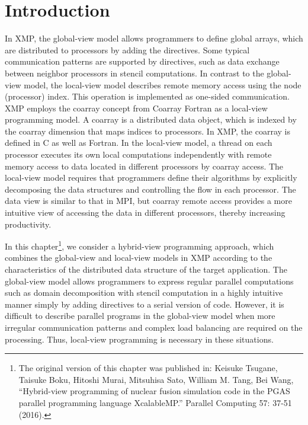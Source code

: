\section{Introduction\label{sec1}}

In XMP, the global-view model allows programmers to define global arrays, which are distributed to processors by adding the directives. Some typical communication patterns are supported by directives, such as data exchange between neighbor processors in stencil computations.
In contrast to the global-view model, the local-view model describes remote memory access using the node (processor) index. This operation is implemented as one-sided communication. XMP employs the coarray concept from Coarray Fortran as a local-view programming model. A coarray is a distributed data object, which is indexed by the coarray dimension that maps indices to processors.
In XMP, the coarray is defined in C as well as Fortran. In the local-view model, a thread on each processor executes its own local computations independently with remote memory access to data located in different processors by coarray access. The local-view model requires that programmers define their algorithms by explicitly decomposing the data structures and controlling the flow in each processor. The data view is similar to that in MPI, but coarray remote access provides a more intuitive view of accessing the data in different processors, thereby increasing productivity.

In this chapter\footnote{
  The original version of this chapter was published in: 
  Keisuke Tsugane, Taisuke Boku, Hitoshi Murai, Mitsuhisa Sato, William M. Tang, Bei Wang, ``Hybrid-view programming of nuclear fusion simulation code in the PGAS parallel programming language XcalableMP.'' Parallel Computing 57: 37-51 (2016).
  }, we consider a hybrid-view programming approach, which combines the global-view and local-view models in XMP according to the characteristics of the distributed data structure of the target application.
The global-view model allows programmers to express regular parallel computations such as domain decomposition with stencil computation in a highly intuitive manner simply by adding directives to a serial version of code. However, it is difficult to describe parallel programs in the global-view model when more irregular communication patterns and complex load balancing are required on the processing. Thus, local-view programming is necessary in these situations.

